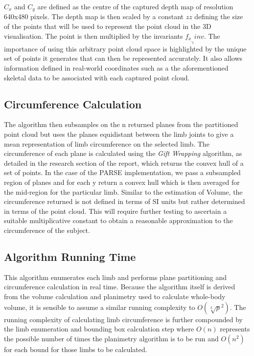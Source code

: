$C_x$ and $C_y$ are defined as the centre of the captured depth map of resolution 640x480 pixels. The depth map is then scaled by a constant $zz$ defining the size of the points that will be used to represent the point cloud in the 3D visualisation. The point is then multiplied by the invariants $f_x_,_yinv$. The importance of using this arbitrary point cloud space is highlighted by the unique set of points it generates that can then be represented accurately. It also allows information defined in real-world coordinates such as a the aforementioned skeletal data to be associated with each captured point cloud.

\subsection{Circumference Calculation}

The algorithm then subsamples on the n returned planes from the partitioned point cloud but uses the planes equidistant between the limb joints to give a mean representation of limb circumference on the selected limb. The circumference of each plane is calculated using the \emph{Gift Wrapping} algorithm, as detailed in the research section of the report, which returns the convex hull of a set of points. In the case of the PARSE implementation, we pass a subsampled region of planes and for each y return a convex hull which is then averaged for the mid-region for the particular limb. Similar to the estimation of Volume, the circumference returned is not defined in terms of SI units but rather determined in terms of the point cloud. This will require further testing to ascertain a suitable multiplicative constant to obtain a reasonable approximation to the circumference of the subject. \\

\subsection{Algorithm Running Time}

This algorithm enumerates each limb and performs plane partitioning and circumference calculation in real time. Because the algorithm itself is derived from the volume calculation and planimetry used to calculate whole-body volume, it is sensible to assume a similar running complexity to $O(\sqrt[3]{p}^2)$. The running complexity of calculating limb circumference is further compounded by the limb enumeration and bounding box calculation step where $O(n)$ represents the possible number of times the planimetry algorithm is to be run and $O(n^2)$ for each bound for those limbs to be calculated.


